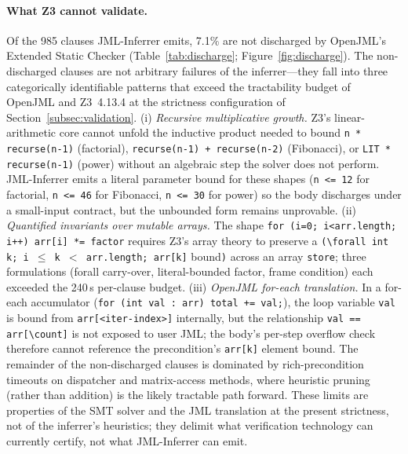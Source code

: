 \paragraph{What Z3 cannot validate.} Of the 985 clauses JML-Inferrer emits, 7.1\% are not discharged by OpenJML's Extended Static Checker (Table~\ref{tab:discharge}; Figure~\ref{fig:discharge}). The non-discharged clauses are not arbitrary failures of the inferrer---they fall into three categorically identifiable patterns that exceed the tractability budget of OpenJML and Z3~4.13.4 at the strictness configuration of Section~\ref{subsec:validation}. (i) \emph{Recursive multiplicative growth.} Z3's linear-arithmetic core cannot unfold the inductive product needed to bound \texttt{n * recurse(n-1)} (factorial), \texttt{recurse(n-1) + recurse(n-2)} (Fibonacci), or \texttt{LIT * recurse(n-1)} (power) without an algebraic step the solver does not perform. JML-Inferrer emits a literal parameter bound for these shapes (\texttt{n <= 12} for factorial, \texttt{n <= 46} for Fibonacci, \texttt{n <= 30} for power) so the body discharges under a small-input contract, but the unbounded form remains unprovable. (ii) \emph{Quantified invariants over mutable arrays.} The shape \texttt{for (i=0; i<arr.length; i++) arr[i] *= factor} requires Z3's array theory to preserve a \texttt{(\textbackslash forall int k; i $\le$ k $<$ arr.length; arr[k]} bound\texttt{)} across an array \texttt{store}; three formulations (forall carry-over, literal-bounded factor, frame condition) each exceeded the 240\,s per-clause budget. (iii) \emph{OpenJML for-each translation.} In a for-each accumulator (\texttt{for (int val : arr) total += val;}), the loop variable \texttt{val} is bound from \texttt{arr[<iter-index>]} internally, but the relationship \texttt{val == arr[\textbackslash count]} is not exposed to user JML; the body's per-step overflow check therefore cannot reference the precondition's \texttt{arr[k]} element bound. The remainder of the non-discharged clauses is dominated by rich-precondition timeouts on dispatcher and matrix-access methods, where heuristic pruning (rather than addition) is the likely tractable path forward. These limits are properties of the SMT solver and the JML translation at the present strictness, not of the inferrer's heuristics; they delimit what verification technology can currently certify, not what JML-Inferrer can emit.

